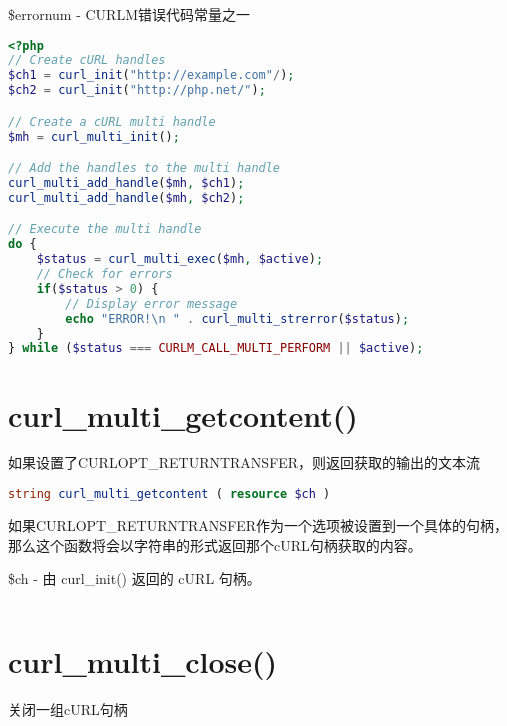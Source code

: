 \begin{compactitem}
\item \$errornum - CURLM错误代码常量之一
\end{compactitem}



\begin{lstlisting}[language=PHP]
<?php
// Create cURL handles
$ch1 = curl_init("http://example.com"/);
$ch2 = curl_init("http://php.net/");

// Create a cURL multi handle
$mh = curl_multi_init();

// Add the handles to the multi handle
curl_multi_add_handle($mh, $ch1);
curl_multi_add_handle($mh, $ch2);

// Execute the multi handle
do {
    $status = curl_multi_exec($mh, $active);
    // Check for errors
    if($status > 0) {
        // Display error message
        echo "ERROR!\n " . curl_multi_strerror($status);
    }
} while ($status === CURLM_CALL_MULTI_PERFORM || $active);
\end{lstlisting}



\section{curl\_multi\_getcontent()}

如果设置了CURLOPT\_RETURNTRANSFER，则返回获取的输出的文本流

\begin{lstlisting}[language=PHP]
string curl_multi_getcontent ( resource $ch )
\end{lstlisting}

如果CURLOPT\_RETURNTRANSFER作为一个选项被设置到一个具体的句柄，那么这个函数将会以字符串的形式返回那个cURL句柄获取的内容。

\begin{compactitem}
\item \$ch - 由 curl\_init() 返回的 cURL 句柄。
\end{compactitem}


\begin{lstlisting}[language=PHP]

\end{lstlisting}


\section{curl\_multi\_close()}

关闭一组cURL句柄

